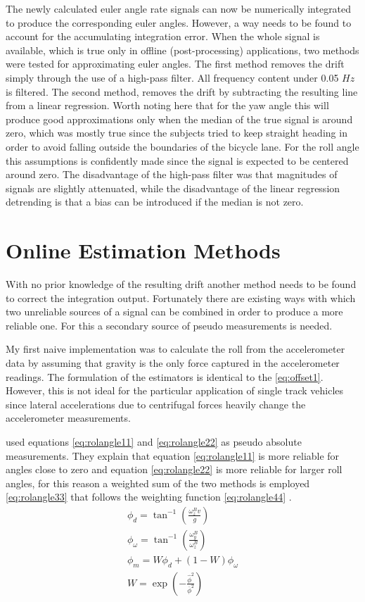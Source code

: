 The newly calculated  euler angle rate signals can now be numerically integrated to produce the corresponding euler angles. However, a way needs to be found to account for the accumulating integration error. When the whole signal is available, which is true only in offline (post-processing) applications, two methods were tested for approximating euler angles.  The first method removes the drift simply through the use of a high-pass filter. All frequency content under 0.05 \ensuremath{\si{Hz}} is filtered. The second method,  removes the drift  by subtracting the resulting line from a linear regression. Worth noting here that for the yaw angle this will produce good approximations only when the median of the true signal is around zero, which was mostly true since the subjects tried to keep straight heading in order to avoid falling outside the boundaries of the bicycle lane. For the roll angle this assumptions is confidently made since the signal is expected to be centered around zero. The disadvantage of the high-pass filter was that magnitudes of signals are slightly attenuated, while the disadvantage of the linear regression detrending is that a bias can be introduced if the median is not zero.

\section{Online Estimation Methods}

With no prior knowledge of the resulting drift another method needs to be found  to correct the integration output. Fortunately there are existing ways with which two unreliable sources of a signal can be combined in order to produce a more reliable one. For this a secondary source of pseudo measurements is needed. 

My first naive implementation was to calculate the roll  from the accelerometer data by assuming that gravity is the only force captured in the accelerometer readings. The formulation of the estimators is identical to the \cref{eq:offset1}. However, this is not ideal for the particular application of single track vehicles since lateral accelerations due to centrifugal forces heavily change the accelerometer measurements. 

\citet{sanjurjo2018roll} used equations \ref{eq:rolangle11} and \ref{eq:rolangle22}  as pseudo absolute measurements. They explain that equation \ref{eq:rolangle11} is more reliable for  angles close to zero and equation \ref{eq:rolangle22} is more reliable for larger roll angles, for this reason  a weighted sum of the two methods is employed \ref{eq:rolangle33} that follows the weighting function \ref{eq:rolangle44} .
\begin{align}
      \phi_{d}=\tan^{-1}\left(\frac{\omega_{z}^{B} v}{g}\right) \label{eq:rolangle11}
    \\
      \phi_{\omega}=\tan^{-1} \left(\frac{\omega_{y}^{B}}{\omega_{z}^{B}}\right)\label{eq:rolangle22}
      \\
      \phi_{m}=W \phi_{d}+(1-W) \phi_{\omega} \label{eq:rolangle33} 
      \\
      W=\exp \left(-\frac{\hat{\phi}^{2}}{\overline{\phi}^{2}}\right)
  \label{eq:rolangle44}
\end{align}

